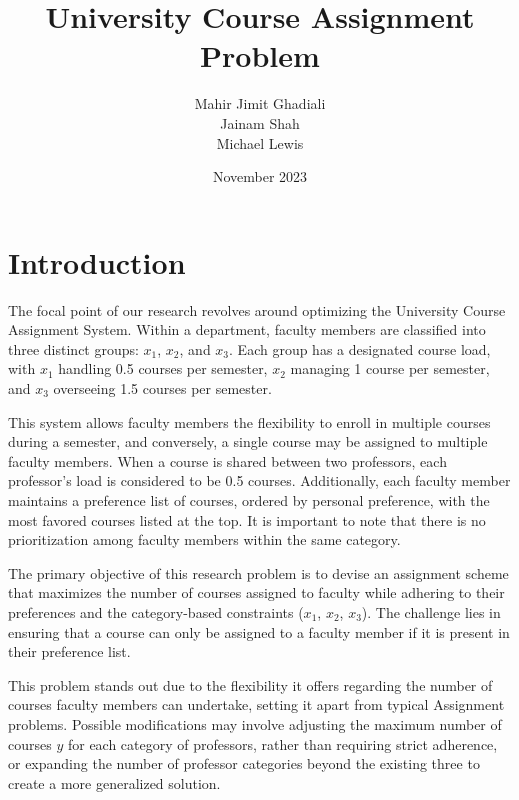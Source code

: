 \documentclass{article}
\title{University Course Assignment Problem}
\author{
  Mahir Jimit Ghadiali \\
  Jainam Shah \\
  Michael Lewis
}
\date{November 2023}
\begin{document}
\maketitle

\section{Introduction}
The focal point of our research revolves around optimizing the University Course Assignment System. Within a department, faculty members are classified into three distinct groups: $x_1$, $x_2$, and $x_3$. Each group has a designated course load, with $x_1$ handling 0.5 courses per semester, $x_2$ managing 1 course per semester, and $x_3$ overseeing 1.5 courses per semester.

This system allows faculty members the flexibility to enroll in multiple courses during a semester, and conversely, a single course may be assigned to multiple faculty members. When a course is shared between two professors, each professor's load is considered to be 0.5 courses. Additionally, each faculty member maintains a preference list of courses, ordered by personal preference, with the most favored courses listed at the top. It is important to note that there is no prioritization among faculty members within the same category.

The primary objective of this research problem is to devise an assignment scheme that maximizes the number of courses assigned to faculty while adhering to their preferences and the category-based constraints ($x_1$, $x_2$, $x_3$). The challenge lies in ensuring that a course can only be assigned to a faculty member if it is present in their preference list.

This problem stands out due to the flexibility it offers regarding the number of courses faculty members can undertake, setting it apart from typical Assignment problems. Possible modifications may involve adjusting the maximum number of courses $y$ for each category of professors, rather than requiring strict adherence, or expanding the number of professor categories beyond the existing three to create a more generalized solution.
\end{document}
